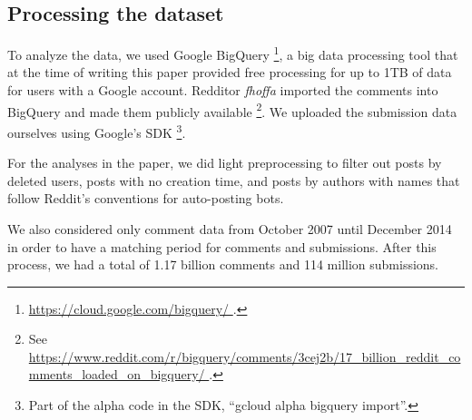 \subsection{Processing the dataset}

To analyze the data, we used Google BigQuery \footnote{\url{https://cloud.google.com/bigquery/ }.}, a big data processing tool that at the time of writing this paper provided free processing for up to 1TB of data for users with a Google account.  Redditor \textit{fhoffa} imported the comments into BigQuery and made them publicly available \footnote{See \url{https://www.reddit.com/r/bigquery/comments/3cej2b/17_billion_reddit_comments_loaded_on_bigquery/ }.}.  We uploaded the submission data ourselves using Google's SDK \footnote{Part of the alpha code in the SDK, ``gcloud alpha bigquery import''.}.

For the analyses in the paper, we did light preprocessing to filter out posts by deleted users, posts with no creation time, and posts by authors with names that follow Reddit's conventions for auto-posting bots. 

%

We also considered only comment data from October 2007 until December 2014 in order to have a matching period for comments and submissions. After this process, we had a total of 1.17 billion comments and 114 million submissions.

